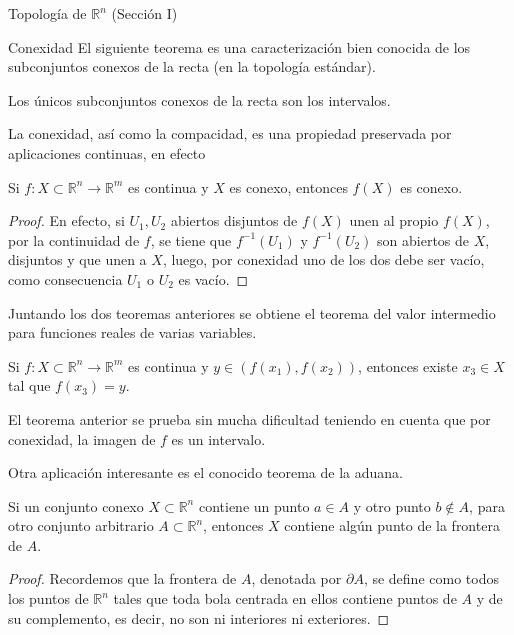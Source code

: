\begin{chapter}{Topología de $\mathbb{R}^n$ (Sección I)}
\begin{section}{Conexidad}
El siguiente teorema es una caracterización bien conocida de los subconjuntos conexos de la recta (en la topología estándar).

\begin{them}
Los únicos subconjuntos conexos de la recta son los intervalos.
\end{them}

La conexidad, así como la compacidad, es una propiedad preservada por aplicaciones continuas, en efecto

\begin{them}
Si $f: X \subset \mathbb{R}^n \to \mathbb{R}^m$ es continua y $X$ es conexo, entonces $f(X)$ es conexo.
\end{them}

\begin{proof}
En efecto, si $U_1, U_2$ abiertos disjuntos de $f(X)$ unen al propio $f(X)$, por la continuidad de $f$, se tiene que $f^{-1}(U_1)$ y $f^{-1}(U_2)$ son abiertos de $X$, disjuntos y que unen a $X$, luego, por conexidad uno de los dos debe ser vacío, como consecuencia $U_1$ o $U_2$ es vacío.
\end{proof}

Juntando los dos teoremas anteriores se obtiene el teorema del valor intermedio para funciones reales de varias variables.

\begin{them}

Si $f: X \subset \mathbb{R}^n \to \mathbb{R}^m$ es continua y $y \in (f(x_1),f(x_2))$, entonces existe $x_3 \in X$ tal que $f(x_3) = y$.

\end{them}

El teorema anterior se prueba sin mucha dificultad teniendo en cuenta que por conexidad, la imagen de $f$ es un intervalo.

Otra aplicación interesante es el conocido teorema de la aduana.

\begin{them}

Si un conjunto conexo $X \subset \mathbb{R}^n$ contiene un punto $a \in A$ y otro punto $b \notin A$, para otro conjunto arbitrario $A \subset \mathbb{R}^n$, entonces $X$ contiene algún punto de la frontera de $A$.

\end{them}

\begin{proof}

Recordemos que la frontera de $A$, denotada por $\partial A$, se define como todos los puntos de $\mathbb{R}^n$ tales que toda bola centrada en ellos contiene puntos de $A$ y de su complemento, es decir, no son ni interiores ni exteriores.


\end{proof}
\end{section}
\end{chapter}
